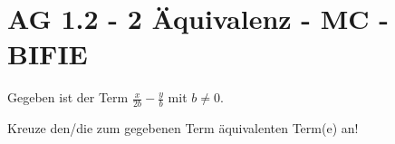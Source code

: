 \section{AG 1.2 - 2 Äquivalenz - MC - BIFIE}

\begin{beispiel}[AG 1.2]{1} %
Gegeben ist der Term $\frac{x}{2b}-\frac{y}{b}$ mit $b\neq 0$.
			
			Kreuze den/die zum gegebenen Term äquivalenten Term(e) an!
\end{beispiel}